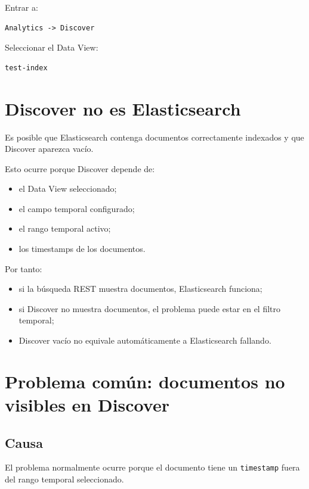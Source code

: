 \documentclass[
  coursetitle={Cómputo Nube y Tecnologías Emergentes},
  coursehours={96},
  coursedate={Verano 2026},
  doctype={Laboratorio},
  otherlangs={english,french},
  authorname={Lázaro},
  authorsurname={Bustio-Martínez},
  authortitle={PhD},
  role={Profesor Investigador},
  email={lbustio@inaoe.mx},
  phone={5559504000},
  ext={7459},
  institution={Instituto Nacional de Astrofísica, Óptica y Electrónica (INAOE)},
  department={Maestría en Ciencias en Tecnologías de Seguridad},
  address={Luis Enrique Erro 1, Sta. Ma. Tonantzintla, San Andrés Cholula, CP 72840, Puebla, México},
  margin={0.5in}
]{../../lbustio_lecture_notes}
\begin{document}
Entrar a:

\begin{verbatim}
Analytics -> Discover
\end{verbatim}

Seleccionar el Data View:

\begin{verbatim}
test-index
\end{verbatim}

\section{Discover no es Elasticsearch}

Es posible que Elasticsearch contenga documentos correctamente indexados y que Discover aparezca vacío.

Esto ocurre porque Discover depende de:

\begin{itemize}
    \item el Data View seleccionado;
    \item el campo temporal configurado;
    \item el rango temporal activo;
    \item los timestamps de los documentos.
\end{itemize}

Por tanto:

\begin{itemize}
    \item si la búsqueda REST muestra documentos, Elasticsearch funciona;
    \item si Discover no muestra documentos, el problema puede estar en el filtro temporal;
    \item Discover vacío no equivale automáticamente a Elasticsearch fallando.
\end{itemize}

\section{Problema común: documentos no visibles en Discover}

\subsection{Causa}

El problema normalmente ocurre porque el documento tiene un \texttt{timestamp} fuera del rango temporal seleccionado.
\end{document}
